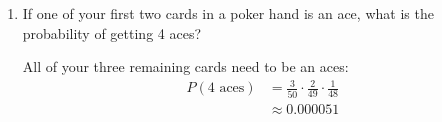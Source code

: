\documentclass[letterpaper, landscape]{exam}
\begin{document}
\begin{enumerate}
      \begin{solution}
        Exactly one of your three remaining cards needs to not be an ace:
        \begin{align*}
          P(1st) & = \frac{47}{50} \cdot \frac{3}{49} \cdot \frac{2}{48} \\
          P(2nd) & = \frac{3}{50} \cdot \frac{47}{49} \cdot \frac{2}{48} \\
          P(3rd) & = \frac{3}{50} \cdot \frac{2}{49} \cdot \frac{47}{48} \\
                 & \approx 0.0024 \\
        \end{align*}

        The probabilities are all the same: $0.055$. Since there are three of
        them, the probability of getting exactly one ace is: 
        \[
          3 \cdot 0.0024 = 0.0072 \\
        \]
      \end{solution}

    \item If one of your first two cards in a poker hand is an ace, what is the
      probability of getting 4 aces?

      \begin{solution}
        All of your three remaining cards need to be an aces:
        \begin{align*}
          P(\text{4 aces}) & = \frac{3}{50} \cdot \frac{2}{49} \cdot \frac{1}{48} \\
                           & \approx \boxed{ 0.000051 } \\
        \end{align*}
      \end{solution}
  \end{enumerate}



\end{document}
